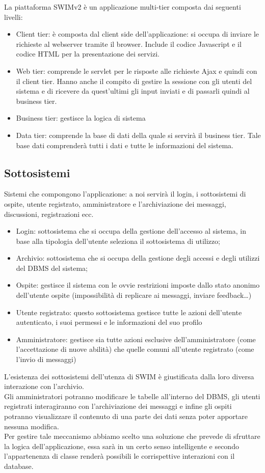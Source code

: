 \documentclass[a4paper,12pt]{article}
\begin{document}
La piattaforma SWIMv2 è un applicazione multi-tier composta dai seguenti livelli:
\begin{itemize}
\item Client tier: è composta dal client side dell’applicazione: si occupa di inviare le richieste al webserver tramite il browser. Include il codice Javascript e il codice HTML per la presentazione dei servizi.
\item Web tier: comprende le servlet per le risposte alle richieste Ajax e quindi con il client tier. Hanno anche il compito di gestire la sessione con gli utenti del sistema e di ricevere da quest’ultimi gli input inviati e di passarli quindi al business tier.
\item Business tier: gestisce la logica di sistema
\item Data tier: comprende la base di dati della quale si servirà il business tier. Tale base dati comprenderà tutti i dati e tutte le informazioni del sistema.
\end{itemize}

\subsection{Sottosistemi}
Sistemi che compongono l’applicazione: a noi servirà il login, i sottosistemi di ospite, utente registrato, amministratore e l’archiviazione dei messaggi, discussioni, registrazioni ecc.
\begin{itemize}
\item Login: sottosistema che si occupa della gestione dell’accesso al sistema, in base alla tipologia dell’utente seleziona il sottosistema di utilizzo; 
\item Archivio: sottosistema che si occupa della gestione degli accessi e degli utilizzi del DBMS del sistema; 
\item Ospite: gestisce il sistema con le ovvie restrizioni imposte dallo stato anonimo dell’utente ospite (impossibilità di replicare ai messaggi, inviare feedback…)
\item Utente registrato: questo sottosistema gestisce tutte le azioni dell’utente autenticato, i suoi permessi e le informazioni del suo profilo
\item Amministratore: gestisce sia tutte azioni esclusive dell’amministratore (come l’accettazione di nuove abilità) che quelle comuni all’utente registrato (come l’invio di messaggi)
\end{itemize}

L’esistenza dei sottosistemi dell’utenza di SWIM è giustificata dalla loro diversa interazione con l’archivio.\\[1\baselineskip]Gli amministratori potranno modificare le tabelle all’interno del DBMS, gli utenti registrati interagiranno con l’archiviazione dei messaggi e infine gli ospiti potranno visualizzare il contenuto di una parte dei dati senza poter apportare nessuna modifica.\\[1\baselineskip]Per gestire tale meccanismo abbiamo scelto una soluzione che prevede di sfruttare la logica dell’applicazione, essa sarà in un certo senso intelligente e secondo l’appartenenza di classe renderà possibili le corrispettive interazioni con il database.
\end{document}

